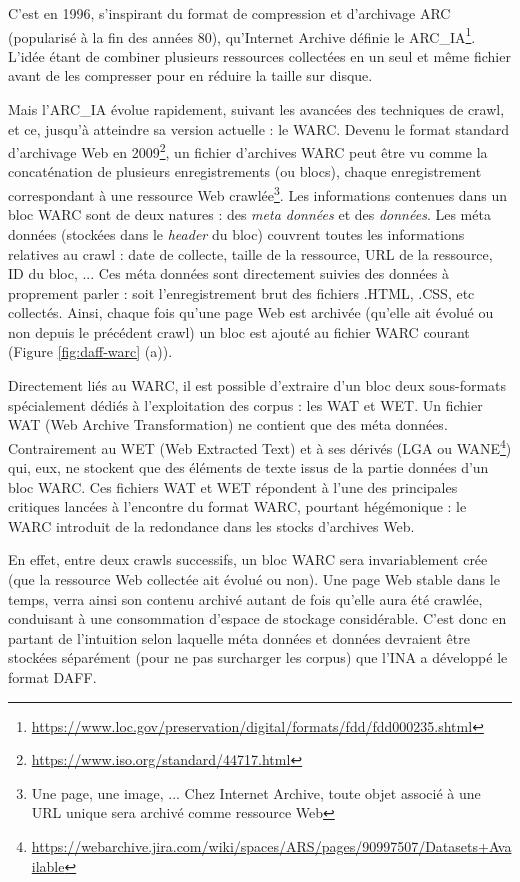 \documentclass[symmetric,justified,marginals=raggedouter]{tufte-book}
\begin{document}
C'est en 1996, s'inspirant du format de compression et d'archivage ARC (popularisé à la fin des années 80), qu'Internet Archive définie le ARC\_IA\footnote{\url{https://www.loc.gov/preservation/digital/formats/fdd/fdd000235.shtml}}. L'idée étant de combiner plusieurs ressources collectées en un seul et même fichier avant de les compresser pour en réduire la taille sur disque.

Mais l'ARC\_IA évolue rapidement, suivant les avancées des techniques de crawl, et ce, jusqu'à atteindre sa version actuelle : le WARC. Devenu le format standard d'archivage Web en 2009\footnote{\url{https://www.iso.org/standard/44717.html}}, un fichier d'ar\-chives WARC peut être vu comme la concaténation de plusieurs enregistrements (ou blocs), chaque enregistrement correspondant à une ressource Web crawlée\footnote{Une page, une image, ... Chez Internet Archive, toute objet associé à une URL unique sera archivé comme ressource Web}. Les informations contenues dans un bloc WARC sont de deux natures : des \textit{meta données} et des \textit{données}. Les méta données (stockées dans le \textit{header} du bloc) couvrent toutes les informations relatives au crawl : date de collecte, taille de la ressource, URL de la ressource, ID du bloc, ... Ces méta données sont directement suivies des données à proprement parler : soit l'enregistrement brut des fichiers .HTML, .CSS, etc collectés. Ainsi, chaque fois qu'une page Web est archivée (qu'elle ait évolué ou non depuis le précédent crawl) un bloc est ajouté au fichier WARC courant (Figure \ref{fig:daff-warc} (a)). 

Directement liés au WARC, il est possible d'extraire d'un bloc deux sous-formats spécialement dédiés à l'exploitation des corpus : les WAT et WET. Un fichier WAT (Web Archive Transformation) ne contient que des méta données. Contrairement au WET (Web Extracted Text) et à ses dérivés (LGA ou WANE\footnote{\url{https://webarchive.jira.com/wiki/spaces/ARS/pages/90997507/Datasets+Available}}) qui, eux, ne stockent que des éléments de texte issus de la partie données d'un bloc WARC. Ces fichiers WAT et WET répondent à l'une des principales critiques lancées à l'encontre du format WARC, pourtant hégémonique : le WARC introduit de la redondance dans les stocks d'archives Web.

En effet, entre deux crawls successifs, un bloc WARC sera invariablement crée (que la ressource Web collectée ait évolué ou non). Une page Web stable dans le temps, verra ainsi son contenu archivé autant de fois qu'elle aura été crawlée, conduisant à une consommation d'espace de stockage considérable. C'est donc en partant de l'intuition selon laquelle méta données et données devraient être stockées séparément (pour ne pas surcharger les corpus) que l'INA a développé le format DAFF.  
\end{document}
